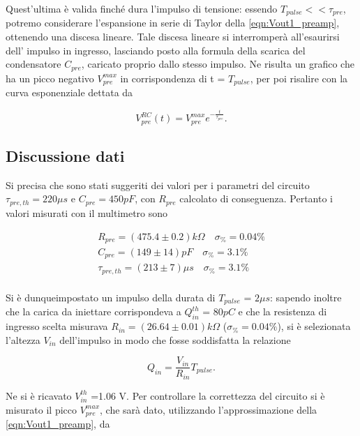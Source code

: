 \documentclass{article}
\begin{document}
Quest'ultima è valida finché dura l'impulso di tensione: essendo $T_{pulse} << \tau_{pre}$, potremo considerare l'espansione in 
serie di Taylor della \ref{eqn:Vout1_preamp}, ottenendo una discesa lineare. Tale discesa lineare si interromperà all'esaurirsi dell'
impulso in ingresso, lasciando posto alla formula della scarica del condensatore $C_{pre}$, caricato proprio dallo stesso impulso.
Ne risulta un grafico che ha un picco negativo $V_{pre}^{max}$ in corrispondenza di t = $T_{pulse}$, per poi risalire con la curva esponenziale
dettata da

\begin{equation}
    \label{eqn:Vout2_preamp}
    V_{pre}^{RC}(t) = V_{pre}^{max}e^{-\frac{t}{\tau_{pre}}}.
\end{equation}

\subsection{Discussione dati}

Si precisa che sono stati suggeriti dei valori per i parametri del circuito $\tau_{pre,th} = 220 \mu s$ e $C_{pre} = 450 pF$, con $R_{pre}$ calcolato di 
conseguenza. Pertanto i valori misurati con il multimetro sono

\begin{align*}
    R_{pre} = (475.4 \pm 0.2)k\Omega \quad \sigma_{\%}=0.04 \% \\    
    C_{pre} = (149 \pm 14) pF \quad \sigma_{\%}=3.1 \%    \\
    \tau_{pre,th} = (213 \pm 7)\mu s \quad \sigma_{\%}=3.1 \%     \\
\end{align*}

Si è dunqueimpostato un impulso della durata di $T_{pulse}$ = $2 \mu s$: sapendo inoltre che la carica da iniettare 
corrispondeva a $Q_{in}^{th}$ = $80 pC$ e che la resistenza di ingresso scelta misurava $R_{in}=(26.64\pm0.01) k\Omega$ ($\sigma_{\%}=0.04\%$), 
si è selezionata l'altezza $V_{in}$ dell'impulso in modo che fosse soddisfatta la relazione

\begin{equation}
    \label{eqn:Qin}
    Q_{in} = \frac{V_{in}}{R_{in}} T_{pulse}.
\end{equation}

Ne si è ricavato $V_{in}^{th}$ =1.06 V. Per controllare la correttezza del circuito si è misurato il picco $V_{pre}^{max}$, che sarà
dato, utilizzando l'approssimazione della \ref{eqn:Vout1_preamp}, da
\end{document}
